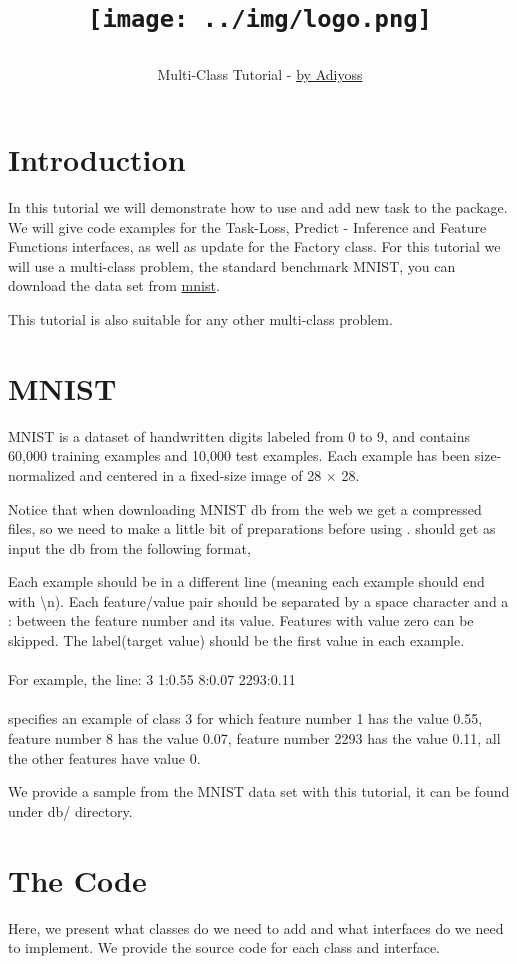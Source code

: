 \documentclass[11pt, oneside]{article}   	%
\title{\centerline{\texttt{[image: ../img/logo.png]}}}
\author{Multi-Class Tutorial - \href{http://adiyoss.github.io/}{by Adiyoss}}
\begin{document}
\maketitle
\section{Introduction}
In this tutorial we will demonstrate how to use and add new task to the \stred package. We will give code examples for the Task-Loss, Predict - Inference and Feature Functions interfaces, as well as update for the Factory class. For this tutorial we will use a multi-class problem, the standard benchmark MNIST, you can download the data set from \href{http://yann.lecun.com/exdb/mnist/}{mnist}.

This tutorial is also suitable for any other multi-class problem.

\section{MNIST}
MNIST is a dataset of handwritten digits labeled from 0 to 9, and contains 60,000 training examples and 10,000 test examples. Each example has been size-normalized and centered in a fixed-size image of 28 $\times$ 28. 

Notice that when downloading MNIST db from the web we get a compressed files, so we need to make a little bit of preparations before using \stred.
\stred should get as input the db from the following format, 

Each example should be in a different line (meaning each example should end with \textbackslash n). Each feature/value pair should be separated by a space character and a : between the feature number and its value. Features with value zero can be skipped. The label(target value) should be the first value in each example. 
\\\\
For example, the line: 3 1:0.55 8:0.07 2293:0.11
\\\\
specifies an example of class 3 for which feature number 1 has the value 0.55, feature number 8 has the value 0.07, feature number 2293 has the value 0.11, all the other features have value 0.

We provide a sample from the MNIST data set with this tutorial, it can be found under db/ directory.

\section{The Code}
Here, we present what classes do we need to add and what interfaces do we need to implement. We provide the source code for each class and interface.
\end{document}
